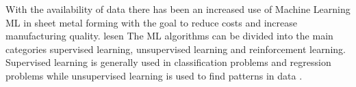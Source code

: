 







With the availability of data there has been an increased use of Machine Learning \ac{
    ML} in
sheet metal forming with the goal to reduce costs and increase manufacturing quality.
\cite{bock_reviewapplicationmachine_2019} \cite[]{cao_manufacturingadvancedsmart_2019}
lesen
The ML algorithms can be divided into the main categories supervised learning,
unsupervised
learning and reinforcement learning. \cite[]{liu_reinforcementlearningfreeform_2020}
Supervised learning is generally used in classification problems and regression
problems while
unsupervised learning is used to find patterns in data \cite[p.
2]{cruz_applicationmachinelearning_2021}.


